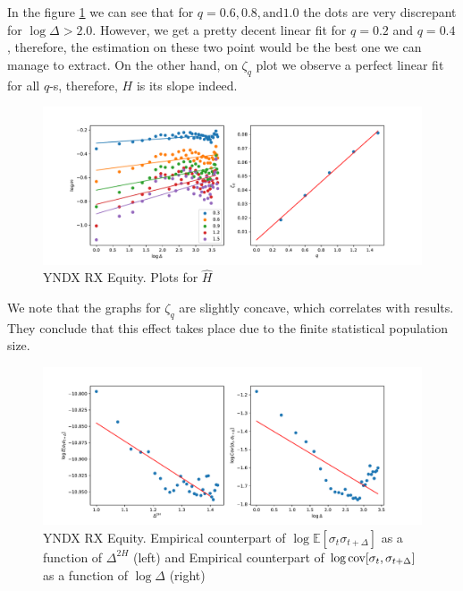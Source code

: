         In the figure \ref{fig:logMDelta} we can see that for $q = 0.6, 0.8, \text{and} 1.0$ the dots are very discrepant for $\log\Delta > 2.0$. 
        However, we get a pretty decent linear fit for $q = 0.2$ and $q = 0.4$, therefore, the estimation on these two point would be the best one
        we can manage to extract. On the other hand, on $\zeta_q$ plot we observe a perfect linear fit for all $q$-s, therefore, $H$
        is its slope indeed.

        \begin{figure}[htbp]
            \includegraphics[width=\textwidth]{fig/YNDX RX Equity Hurst Est.pdf}
            \caption{YNDX RX Equity. Plots for $\hat{H}$}
            \label{fig:logMDelta}
        \end{figure}

        We note that the graphs for $\zeta_q$ are slightly concave, which correlates with \cite{GatheralRosenbaum2014} results.
        They conclude that this effect takes place due to the finite statistical population size.

        \begin{figure}
            \includegraphics[width=\textwidth]{fig/YNDX RX Equity logE vs logD.pdf}
            \caption{YNDX RX Equity. Empirical counterpart of $\log\mathbb{E} \left[\sigma_{t}\sigma_{t+\Delta}\right]$ as a function of $\Delta^{2H}$ (left) and Empirical counterpart of $\log\operatorname*{cov} [\sigma_{t}, \sigma_{t+\Delta}]$ as a function of $\log\Delta$ (right)}
        \end{figure}

